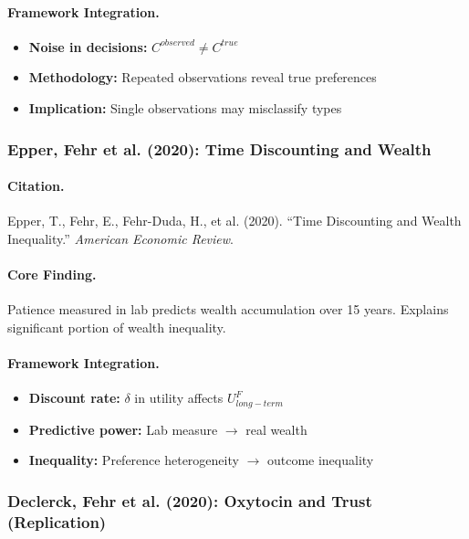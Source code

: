 \documentclass[12pt,a4paper]{article}
\begin{document}
\paragraph{Framework Integration.}
\begin{itemize}
  \item \textbf{Noise in decisions:} $C^{observed} \neq C^{true}$
  \item \textbf{Methodology:} Repeated observations reveal true preferences
  \item \textbf{Implication:} Single observations may misclassify types
\end{itemize}

\subsubsection{Epper, Fehr et al. (2020): Time Discounting and Wealth}

\paragraph{Citation.}
Epper, T., Fehr, E., Fehr-Duda, H., et al. (2020).
``Time Discounting and Wealth Inequality.''
\emph{American Economic Review}.

\paragraph{Core Finding.}
Patience measured in lab predicts wealth accumulation over 15 years.
Explains significant portion of wealth inequality.

\paragraph{Framework Integration.}
\begin{itemize}
  \item \textbf{Discount rate:} $\delta$ in utility affects $U^F_{long-term}$
  \item \textbf{Predictive power:} Lab measure $\to$ real wealth
  \item \textbf{Inequality:} Preference heterogeneity $\to$ outcome inequality
\end{itemize}

\subsubsection{Declerck, Fehr et al. (2020): Oxytocin and Trust (Replication)}
\end{document}
